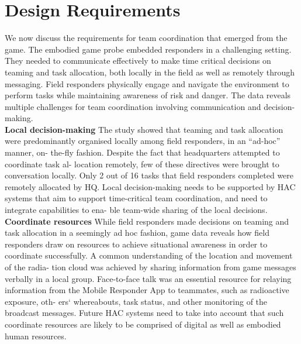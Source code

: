 
\section{Design Requirements}\label{sec:study1requirements}
We now discuss the requirements for team coordination that emerged from the game. The embodied game probe embedded responders in a challenging setting. They needed to communicate effectively to make time critical decisions on teaming and task allocation, both locally in the field as well as remotely through messaging. Field responders physically engage and navigate the environment to perform tasks while maintaining awareness of risk and danger. The data reveals multiple challenges for team coordination involving communication and decision-making. \\

\textbf{Local decision-making} The study showed that teaming and task allocation were predominantly organised locally among field responders, in an ``ad-hoc'' manner, on- the-fly fashion. Despite the fact that headquarters attempted to coordinate task al- location remotely, few of these directives were brought to conversation locally. Only 2 out of 16 tasks that field responders completed were remotely allocated by HQ. Local decision-making needs to be supported by HAC systems that aim to support time-critical team coordination, and need to integrate capabilities to ena- ble team-wide sharing of the local decisions.\\

\textbf{Coordinate resources} While field responders made decisions on teaming and task allocation in a seemingly ad hoc fashion, game data reveals how field responders draw on resources to achieve situational awareness in order to coordinate successfully. A common understanding of the location and movement of the radia- tion cloud was achieved by sharing information from game messages verbally in a local group. Face-to-face talk was an essential resource for relaying information from the Mobile Responder App to teammates, such as radioactive exposure, oth- ers` whereabouts, task status, and other monitoring of the broadcast messages. Future HAC systems need to take into account that such coordinate resources are likely to be comprised of digital as well as embodied human resources. \\

